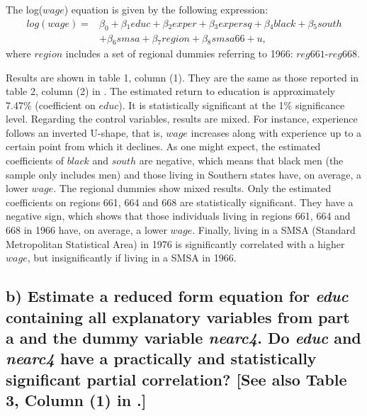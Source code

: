 \documentclass[a4paper, 12pt, twoside]{article}
\begin{document}
The log($wage$) equation is given by the following expression:
\begin{equation*}
\begin{split}
log(wage)=&\beta_0+\beta{_1}educ+\beta{_2}exper+\beta{_3}expersq+\beta{_4}black+\beta{_5}south\\
&+\beta{_6}smsa+\beta{_7}region+\beta{_8}smsa66+u, 
\end{split}
\end{equation*}
where $region$ includes a set of regional dummies referring to 1966: $reg661$-$reg668$. 
\par\vspace{\baselineskip}
Results are shown in table 1, column (1). They are the same as those reported in table 2, column (2) in \cite{Card}. The estimated return to education is approximately 7.47\% (coefficient on $educ$). It is statistically significant at the 1\% significance level. Regarding the control variables, results are mixed. For instance, experience follows an inverted U-shape, that is, $wage$ increases along with experience up to a certain point from which it declines. As one might expect, the estimated coefficients of $black$ and $south$ are negative, which means that black men (the sample only includes men) and those living in Southern states have, on average, a lower $wage$. The regional dummies show mixed results. Only the estimated coefficients on regions 661, 664 and 668 are statistically significant. They have a negative sign, which shows that those individuals living in regions 661, 664 and 668 in 1966 have, on average, a lower $wage$. Finally, living in a SMSA (Standard Metropolitan Statistical Area) in 1976 is significantly correlated with a higher $wage$, but insignificantly if living in a SMSA in 1966. 
\par\vspace{\baselineskip}
\subsection*{b) Estimate a reduced form equation for \textit{educ} containing all explanatory variables from part a and the dummy variable \textit{nearc4}. Do \textit{educ} and \textit{nearc4} have a practically and statistically significant partial correlation? [See also Table 3, Column (1) in \cite{Card}.]}
\end{document}

